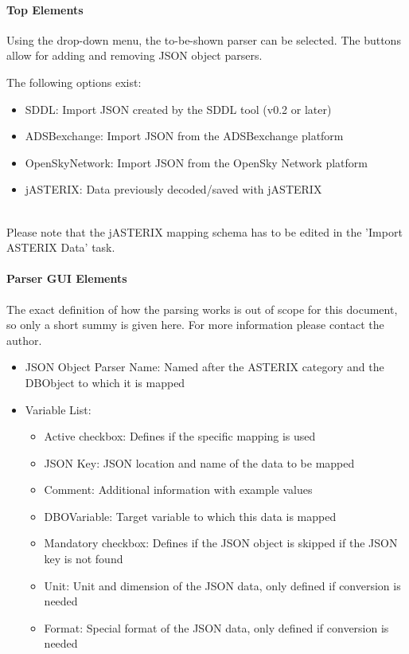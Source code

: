 \paragraph{Top Elements}

Using the drop-down menu, the to-be-shown parser can be selected. The buttons allow for adding and removing JSON object parsers.

The following options exist:
\begin{itemize}  
\item SDDL: Import JSON created by the SDDL tool (v0.2 or later)
\item ADSBexchange: Import JSON from the ADSBexchange platform
\item OpenSkyNetwork: Import JSON from the OpenSky Network platform
\item jASTERIX: Data previously decoded/saved with jASTERIX
\end{itemize}
\ \\

Please note that the jASTERIX mapping schema has to be edited in the 'Import ASTERIX Data' task.


\paragraph{Parser GUI Elements}

The exact definition of how the parsing works is out of scope for this document, so only a short summy is given here. For more information please contact the author.

\begin{itemize}  
\item JSON Object Parser Name: Named after the ASTERIX category and the DBObject to which it is mapped
\item Variable List:
\begin{itemize}  
\item Active checkbox: Defines if the specific mapping is used
\item JSON Key: JSON location and name of the data to be mapped
\item Comment: Additional information with example values
\item DBOVariable: Target variable to which this data is mapped
\item Mandatory checkbox: Defines if the JSON object is skipped if the JSON key is not found
\item Unit: Unit and dimension of the JSON data, only defined if conversion is needed
\item Format: Special format of the JSON data, only defined if conversion is needed
\end{itemize}
\end{itemize}

